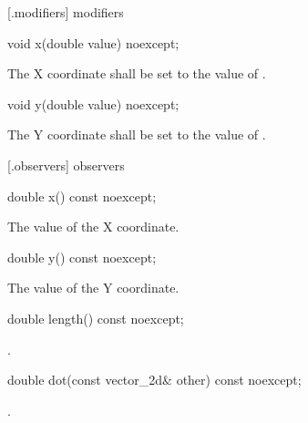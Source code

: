  [\vectortwod.modifiers]{ modifiers}

\begin{itemdecl}
void x(double value) noexcept;
\end{itemdecl}
\begin{itemdescr}
	\pnum
	\effects
	The X coordinate shall be set to the value of .
\end{itemdescr}

\begin{itemdecl}
    void y(double value) noexcept;
\end{itemdecl}
\begin{itemdescr}
	\pnum
	\effects
	The Y coordinate shall be set to the value of .
\end{itemdescr}

 [\vectortwod.observers]{ observers}

\begin{itemdecl}
    double x() const noexcept;
\end{itemdecl}
\begin{itemdescr}
	\pnum
	\returns
	The value of the X coordinate.
\end{itemdescr}

\begin{itemdecl}
    double y() const noexcept;
\end{itemdecl}
\begin{itemdescr}
	\pnum
	\returns
	The value of the Y coordinate.
\end{itemdescr}

\begin{itemdecl}
    double length() const noexcept;
\end{itemdecl}
\begin{itemdescr}
	\pnum
	\returns
	.
\end{itemdescr}

\begin{itemdecl}
    double dot(const vector_2d& other) const noexcept;
\end{itemdecl}
\begin{itemdescr}
	\pnum
	\returns
	.
\end{itemdescr}

